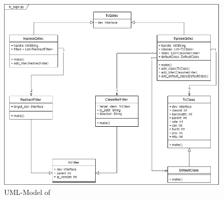 \begin{figure}[h]
	\centering
  	\includegraphics[width=\textwidth]{img/tc_logic_uml.png}
    \caption{UML-Model of }
    \label{tc logic uml}
\end{figure}
